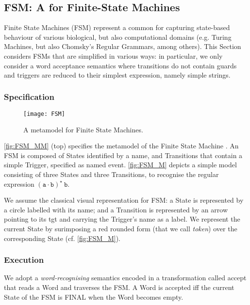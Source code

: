 \subsection{\textsf{FSM}: A \DSL for Finite-State Machines}
\label{sec:Examples:FSM}

Finite State Machines (FSM) represent a common \DSL for capturing state-based 
behaviour of various biological, but also computational domains (e.g. Turing 
Machines, but also Chomsky's Regular Grammars, among others). This Section considers
FSMs that are simplified in various ways: in particular, we only consider a
word acceptance semantics where transitions do not contain guards and triggers are
reduced to their simplest expression, namely simple strings.

\subsubsection{Specification}
\label{sec:Examples:FSM:Specification}

\begin{figure}%
   \texttt{[image: FSM]}%
   \caption{A metamodel for Finite State Machines.}%
   \label{fig:FSM_MM}%
\end{figure}


\autoref{fig:FSM_MM} (top) specifies the metamodel of the Finite State Machine \DSL. 
An \textsf{FSM} is composed of \textsf{State}s identified by a \textsf{name}, and
\textsf{Transition}s that contain a simple \textsf{Trigger}, specified as 
\textsf{name}d event. \autoref{fig:FSM_M} depicts a simple model consisting of 
three \textsf{State}s and three \textsf{Transition}s, to recognise the regular 
expression $\mathtt{(a\cdot b)^\star\ b}$. 

We assume the classical visual representation for \textsf{FSM}: a \textsf{State}
is represented by a circle labelled with its \textsf{name}; and a 
\textsf{Transition} is represented by an arrow pointing to its \textsf{tgt} and 
carrying the \textsf{Trigger}'s name as a label. We represent the \textsf{current}
\textsf{State} by surimposing a red rounded form (that we call \emph{token}) over
the corresponding \textsf{State} (cf. \autoref{fig:FSM_M}).


\subsubsection{Execution}
\label{sec:Examples:FSM:Execution}

We adopt a \emph{word-recognising} semantics encoded in a transformation called
\textsf{accept} that reads a \textsf{Word} and traverses the \textsf{FSM}. A 
\textsf{Word} is accepted iff the \textsf{current} \textsf{State} of the \textsf{FSM}
is \textsf{FINAL} when the \textsf{Word} becomes empty.

